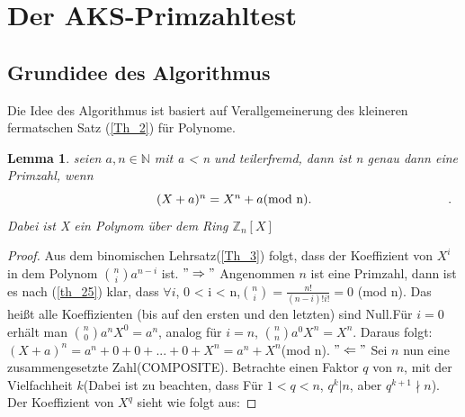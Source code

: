 \documentclass[12pt,oneside]{article}
\newtheorem{lemma}[theorem]{Lemma}
\theoremstyle{remark}
\theoremstyle{definition}
\begin{document}
\section{Der AKS-Primzahltest}
\subsection{Grundidee des Algorithmus}
Die Idee des Algorithmus ist basiert auf  Verallgemeinerung des kleineren fermatschen Satz (\ref{Th_2}) für Polynome.
\begin{flushleft}
\begin{lemma}\label{hauptlemma}
seien $a,n \in \mathbb{N}$ mit a < n und teilerfremd, dann ist n genau dann eine Primzahl, wenn \newline
\begin{equation}\label{eq:1}
\centerline{ $(X + a)^n = X^n +a $(mod n).}.
\end{equation}\newline
Dabei ist X ein Polynom über dem Ring $\mathbb{Z}_{n}[X]$
\end{lemma}
\begin{proof}
Aus dem binomischen Lehrsatz(\ref{Th_3}) folgt, dass der Koeffizient von $X^i$ in dem Polynom ${n \choose i} a^{n-i}$ ist.\newline\newline
$"\Rightarrow"$\newline
Angenommen $n$ ist eine Primzahl, dann ist es nach (\ref{th_25}) klar, dass $\forall i $, 0 < i < n,\newline\smallskip ${n \choose i} = \frac{n!}{(n-i)! i!} = 0 $ (mod n). Das heißt alle Koeffizienten (bis auf den ersten und den letzten) sind Null.\newline\smallskip Für $i = 0$ erhält man  ${n \choose 0} a^n X^0 = a^n$, analog für $i = n$, ${n \choose n} a^0 X^n = X^n$. Daraus folgt:
$(X + a)^n = a^n + 0 + 0 + ... + 0 + X^n = a^n + X^n$(mod n).\newline\newline
$"\Leftarrow"$\newline
Sei $n$ nun eine zusammengesetzte Zahl(COMPOSITE). Betrachte einen Faktor $q$ von $n$, mit der Vielfachheit $k$(Dabei ist zu beachten, dass Für $1 < q < n$, $q^k | n$, aber $q^{k+1} \nmid n$).\newline
Der Koeffizient von $X^q$ sieht wie folgt aus:\newline\smallskip

\end{proof}
\end{flushleft}
\end{document}
